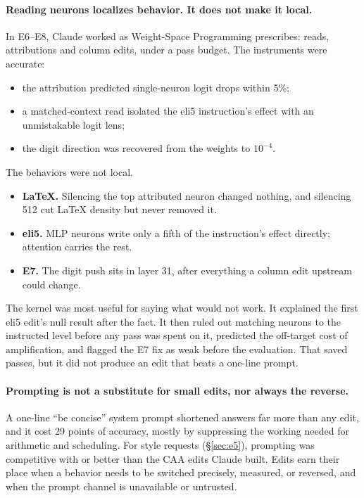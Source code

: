 \paragraph{Reading neurons localizes behavior. It does not make it local.} In E6--E8, Claude worked as Weight-Space Programming prescribes: reads, attributions and column edits, under a pass budget. The instruments were accurate:
\begin{itemize}
\item the attribution predicted single-neuron logit drops within 5\%;
\item a matched-context read isolated the eli5 instruction's effect with an unmistakable logit lens;
\item the digit direction was recovered from the weights to $10^{-4}$.
\end{itemize}
The behaviors were not local.
\begin{itemize}
\item \textbf{LaTeX.} Silencing the top attributed neuron changed nothing, and silencing 512 cut LaTeX density but never removed it.
\item \textbf{eli5.} MLP neurons write only a fifth of the instruction's effect directly; attention carries the rest.
\item \textbf{E7.} The digit push sits in layer 31, after everything a column edit upstream could change.
\end{itemize}
The kernel was most useful for saying what would not work. It explained the first eli5 edit's null result after the fact. It then ruled out matching neurons to the instructed level before any pass was spent on it, predicted the off-target cost of amplification, and flagged the E7 fix as weak before the evaluation. That saved passes, but it did not produce an edit that beats a one-line prompt.

\paragraph{Prompting is not a substitute for small edits, nor always the reverse.} A one-line ``be concise'' system prompt shortened answers far more than any edit, and it cost 29 points of accuracy, mostly by suppressing the working needed for arithmetic and scheduling. For style requests (\S\ref{sec:e5}), prompting was competitive with or better than the CAA edits Claude built. Edits earn their place when a behavior needs to be switched precisely, measured, or reversed, and when the prompt channel is unavailable or untrusted.

